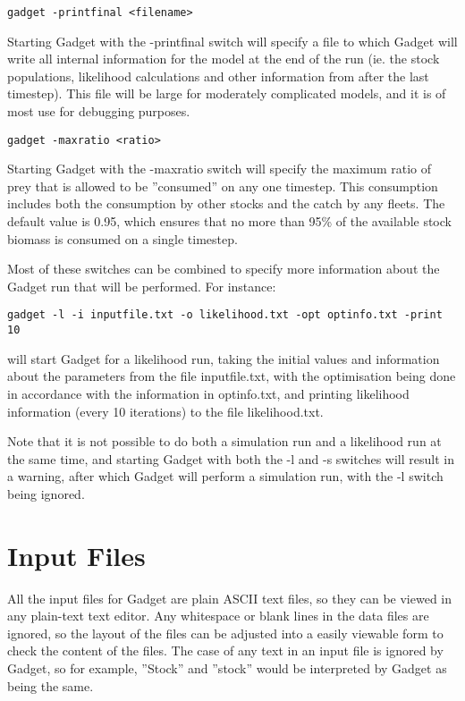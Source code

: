 \documentclass[10pt,twoside]{book}
\begin{document}
{\small\begin{verbatim}
gadget -printfinal <filename>
\end{verbatim}}
Starting Gadget with the -printfinal switch will specify a file to which Gadget will write all internal information for the model at the end of the run (ie. the stock populations, likelihood calculations and other information from after the last timestep).  This file will be large for moderately complicated models, and it is of most use for debugging purposes.

{\small\begin{verbatim}
gadget -maxratio <ratio>
\end{verbatim}}
Starting Gadget with the -maxratio switch will specify the maximum ratio of prey that is allowed to be ''consumed'' on any one timestep.  This consumption includes both the consumption by other stocks and the catch by any fleets.  The default value is 0.95, which ensures that no more than 95\% of the available stock biomass is consumed on a single timestep.


\bigskip
Most of these switches can be combined to specify more information about the Gadget run that will be performed.  For instance:

{\small\begin{verbatim}
gadget -l -i inputfile.txt -o likelihood.txt -opt optinfo.txt -print 10
\end{verbatim}}

will start Gadget for a likelihood run, taking the initial values and information about the parameters from the file inputfile.txt, with the optimisation being done in accordance with the information in optinfo.txt, and printing likelihood information (every 10 iterations) to the file likelihood.txt.

\bigskip
Note that it is not possible to do both a simulation run and a likelihood run at the same time, and starting Gadget with both the -l and -s switches will result in a warning, after which Gadget will perform a simulation run, with the -l switch being ignored.

\chapter{Input Files}\label{chap:input}
All the input files for Gadget are plain ASCII text files, so they can be viewed in any plain-text text editor.  Any whitespace or blank lines in the data files are ignored, so the layout of the files can be adjusted into a easily viewable form to check the content of the files.  The case of any text in an input file is ignored by Gadget, so for example, ''Stock'' and ''stock'' would be interpreted by Gadget as being the same.
\end{document}
